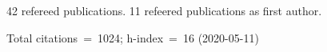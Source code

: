42 refereed publications. 11 refeered publications as first author.

Total citations~=~1024; h-index~=~16 (2020-05-11)